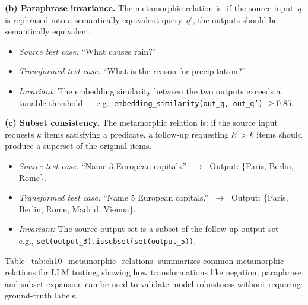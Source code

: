 \noindent\textbf{(b) Paraphrase invariance.}
The metamorphic relation is: if the source input~$q$ is rephrased into a semantically equivalent query~$q'$, the outputs should be semantically equivalent.

\begin{itemize}[leftmargin=1.5em, itemsep=2pt]
    \item \emph{Source test case:} ``What causes rain?''
    \item \emph{Transformed test case:} ``What is the reason for precipitation?''
    \item \emph{Invariant:} The embedding similarity between the two outputs exceeds a tunable threshold --- e.g., \texttt{embedding\_similarity(out\_q, out\_q')} $\geq 0.85$.
\end{itemize}

\noindent\textbf{(c) Subset consistency.}
The metamorphic relation is: if the source input requests $k$ items satisfying a predicate, a follow-up requesting $k' > k$ items should produce a superset of the original items.

\begin{itemize}[leftmargin=1.5em, itemsep=2pt]
    \item \emph{Source test case:} ``Name 3 European capitals.'' $\;\to\;$ Output: \{Paris, Berlin, Rome\}.
    \item \emph{Transformed test case:} ``Name 5 European capitals.'' $\;\to\;$ Output: \{Paris, Berlin, Rome, Madrid, Vienna\}.
    \item \emph{Invariant:} The source output set is a subset of the follow-up output set --- e.g., \texttt{set(output\_3).issubset(set(output\_5))}.
\end{itemize}

Table~\ref{tab:ch10_metamorphic_relations} summarizes common metamorphic relations for LLM testing, showing how transformations like negation, paraphrase, and subset expansion can be used to validate model robustness without requiring ground-truth labels.

